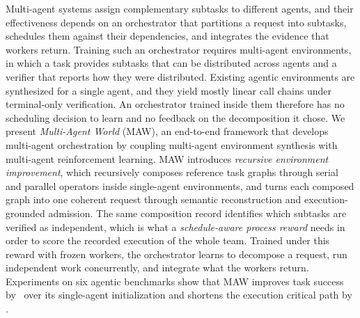 Multi-agent systems assign complementary subtasks to different agents, and their effectiveness depends on an orchestrator that partitions a request into subtasks, schedules them against their dependencies, and integrates the evidence that workers return.
Training such an orchestrator requires multi-agent environments, in which a task provides subtasks that can be distributed across agents and a verifier that reports how they were distributed.
Existing agentic environments are synthesized for a single agent, and they yield mostly linear call chains under terminal-only verification.
An orchestrator trained inside them therefore has no scheduling decision to learn and no feedback on the decomposition it chose.
We present \emph{Multi-Agent World} (MAW), an end-to-end framework that develops multi-agent orchestration by coupling multi-agent environment synthesis with multi-agent reinforcement learning.
MAW introduces \emph{recursive environment improvement}, which recursively composes reference task graphs through serial and parallel operators inside single-agent environments, and turns each composed graph into one coherent request through semantic reconstruction and execution-grounded admission.
The same composition record identifies which subtasks are verified as independent, which is what a \emph{schedule-aware process reward} needs in order to score the recorded execution of the whole team.
Trained under this reward with frozen workers, the orchestrator learns to decompose a request, run independent work concurrently, and integrate what the workers return.
Experiments on six agentic benchmarks show that MAW improves task success by \fillin\ over its single-agent initialization and shortens the execution critical path by \fillin.
